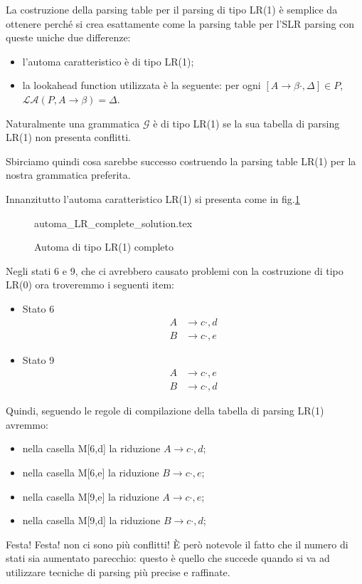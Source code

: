 \documentclass[class=book, crop=false, oneside, 12pt]{standalone}
\begin{document}
La costruzione della parsing table per il parsing di tipo LR(1) è semplice da ottenere perché si crea esattamente come la parsing table per l'SLR parsing con queste uniche due differenze:
\begin{itemize}
    \item l'automa caratteristico è di tipo LR(1);
    \item la lookahead function utilizzata è la seguente: per ogni \([A \to \beta \cdot , \Delta] \in P\), \(\mathcal{LA}(P, A \to \beta ) = \Delta\).
\end{itemize}
Naturalmente una grammatica \(\mathcal{G}\) è di tipo LR(1) se la sua tabella di parsing LR(1) non presenta conflitti.

Sbirciamo quindi cosa sarebbe successo costruendo la parsing table LR(1) per la nostra grammatica preferita.

Innanzitutto l'automa caratteristico LR(1) si presenta come in fig.\ref{fig:lr1_automata-complete}
\begin{figure}[H]
    \centering
    {automa_LR_complete_solution.tex}
    \caption{Automa di tipo LR(1) completo}
    \label{fig:lr1_automata-complete}
\end{figure}
Negli stati 6 e 9, che ci avrebbero causato problemi con la costruzione di tipo LR(0) ora troveremmo i seguenti item:
\begin{itemize}
    \item Stato 6
    \begin{align*}
        A &\to c \cdot , {d} \\
        B &\to c \cdot , {e}    
    \end{align*}
    \item Stato 9
    \begin{align*}
        A &\to c \cdot , {e} \\
        B &\to c \cdot , {d}    
    \end{align*}
\end{itemize}
 Quindi, seguendo le regole di compilazione della tabella di parsing LR(1) avremmo:
 \begin{itemize}
     \item nella casella M[6,d] la riduzione \(A \to c \cdot , {d}\);
     \item nella casella M[6,e] la riduzione \(B \to c \cdot , {e}\);
     \item nella casella M[9,e] la riduzione \(A \to c \cdot , {e}\);
     \item nella casella M[9,d] la riduzione \(B \to c \cdot , {d}\);
 \end{itemize}
Festa! Festa! non ci sono più conflitti!
È però notevole il fatto che il numero di stati sia aumentato parecchio: questo è quello che succede quando si va ad utilizzare tecniche di parsing più precise e raffinate.
\end{document}
